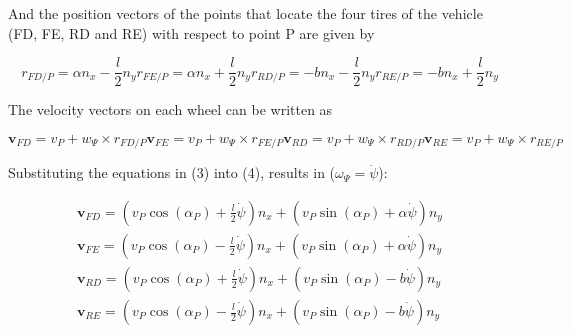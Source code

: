 \documentclass[sublist,a4paper,twoside,11pt]{article}
\begin{document}
And the position vectors of the points that locate the four tires of the vehicle (FD, FE, RD and RE) with respect to point P are given by

\begin{subequations}
	\begin{equation}
	r_{FD/P} = \alpha n_x - \frac{l}{2}n_y
	\end{equation}
	\begin{equation}
		r_{FE/P} = \alpha n_x  + \frac{l}{2}n_y
	\end{equation}
	\begin{equation}
		r_{RD/P} = -b n_x - \frac{l}{2}n_y
	\end{equation}
	\begin{equation}
		r_{RE/P} = -b n_x + \frac{l}{2}n_y
	\end{equation}
\end{subequations}


The velocity vectors on each wheel can be written as

\begin{subequations}
\begin{equation}
\mathbf{v}_{FD}=v_P+w_\Psi \times r_{FD/P}	
\end{equation}
\begin{equation}
\mathbf{v}_{FE}=v_P+w_\Psi \times r_{FE/P}	
\end{equation}
\begin{equation}
\mathbf{v}_{RD}=v_P+w_\Psi \times r_{RD/P}	
\end{equation}
\begin{equation}
\mathbf{v}_{RE}=v_P+w_\Psi \times r_{RE/P}	
\end{equation}

\end{subequations}


Substituting the equations in (3) into (4), results in ($\omega_{\Psi}=\dot{\psi}$): 

\begin{eqnarray*}
	\mathbf{v}_{FD}=\left(v_P \cos(\alpha_P) +\frac{l}{2}\dot{\psi}\right)n_x +\left(v_P \sin(\alpha_P) +\alpha \dot{\psi}\right)n_y\\
	\mathbf{v}_{FE}=\left(v_P \cos(\alpha_P) -\frac{l}{2}\dot{\psi}\right)n_x +\left(v_P \sin(\alpha_P) +\alpha \dot{\psi}\right)n_y\\
	\mathbf{v}_{RD}=\left(v_P \cos(\alpha_P) +\frac{l}{2}\dot{\psi}\right)n_x +\left(v_P \sin(\alpha_P) -b \dot{\psi}\right)n_y\\
	\mathbf{v}_{RE}=\left(v_P \cos(\alpha_P) -\frac{l}{2}\dot{\psi}\right)n_x +\left(v_P \sin(\alpha_P) -b \dot{\psi}\right)n_y\\
\end{eqnarray*}
\end{document}
